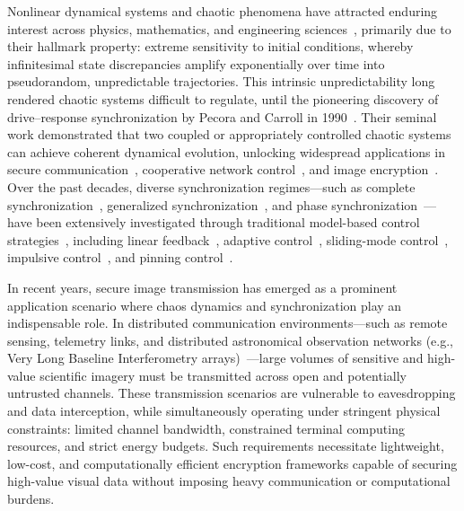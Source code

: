 \documentclass[a4paper,fleqn]{cas-dc}
\theoremstyle{plain}
\theoremstyle{definition}
\begin{document}
Nonlinear dynamical systems and chaotic phenomena have attracted enduring interest across physics, mathematics, and engineering sciences~\cite{strogatz2018nonlinear,boccaletti2006complex,izhikevich2007dynamical}, primarily due to their hallmark property: extreme sensitivity to initial conditions, whereby infinitesimal state discrepancies amplify exponentially over time into pseudorandom, unpredictable trajectories. This intrinsic unpredictability long rendered chaotic systems difficult to regulate, until the pioneering discovery of drive--response synchronization by Pecora and Carroll in 1990~\cite{pecora1990synchronization}. Their seminal work demonstrated that two coupled or appropriately controlled chaotic systems can achieve coherent dynamical evolution, unlocking widespread applications in secure communication~\cite{koronovskii2010on,argyris2005chaos,vanwiggeren1998communication}, cooperative network control~\cite{wen2021coordination,olfati2007consensus}, and image encryption~\cite{zia2022survey,xu2014image}. Over the past decades, diverse synchronization regimes—such as complete synchronization~\cite{lin2005complete}, generalized synchronization~\cite{kocarev1996generalized}, and phase synchronization~\cite{guan2005phase}—have been extensively investigated through traditional model-based control strategies~\cite{ott1990controlling,boccaletti2000control}, including linear feedback~\cite{yassen2005controlling}, adaptive control~\cite{wang2003feedback}, sliding-mode control~\cite{feki2009sliding,su2021fixed,mobayen2018chaos}, impulsive control~\cite{li2005impulsive}, and pinning control~\cite{chen2014pinning}.

In recent years, secure image transmission has emerged as a prominent application scenario where chaos dynamics and synchronization play an indispensable role. In distributed communication environments—such as remote sensing, telemetry links, and distributed astronomical observation networks (e.g., Very Long Baseline Interferometry arrays)~\cite{thompson2017interferometry}—large volumes of sensitive and high-value scientific imagery must be transmitted across open and potentially untrusted channels. These transmission scenarios are vulnerable to eavesdropping and data interception, while simultaneously operating under stringent physical constraints: limited channel bandwidth, constrained terminal computing resources, and strict energy budgets. Such requirements necessitate lightweight, low-cost, and computationally efficient encryption frameworks capable of securing high-value visual data without imposing heavy communication or computational burdens.
\end{document}
